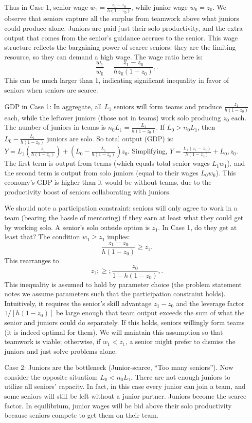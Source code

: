 \documentclass[12pt]{article}
\begin{document}
Thus in Case 1, {senior wage}
\(w_1 = \frac{z_1 - z_0}{h(1-z_0)}\), while {junior wage}
\(w_0 = z_0\). We observe that seniors capture all the {surplus}
from teamwork above what juniors could produce alone. Juniors are paid
just their solo productivity, and the extra output that comes from the
senior's guidance accrues to the senior. This wage structure reflects
the {bargaining power of scarce seniors}: they are the limiting
resource, so they can demand a high wage. The {wage ratio} here
is: 
\begin{equation}
\frac{w_1}{w_0}  =  \frac{z_1 - z_0}{hz_0(1-z_0)},.
\tag{5}
\end{equation}
This can be much larger than 1, indicating significant
inequality in favor of seniors when seniors are scarce.

{GDP in Case 1:} In aggregate, all \(L_1\) seniors will form
teams and produce \(\frac{z_1}{h(1-z_0)}\) each, while the leftover
juniors (those not in teams) work solo producing \(z_0\) each. The
number of juniors in teams is \(n_0 L_1 = \frac{L_1}{h(1-z_0)}\). If
\(L_0 > n_0 L_1\), then \(L_0 - \frac{L_1}{h(1-z_0)}\) juniors are
solo. So total output (GDP) is:
\(Y = L_1 \left(\frac{z_1}{h(1-z_0)}\right) + \left(L_0 - \frac{L_1}{h(1-z_0)}\right) z_0.\)
Simplifying, $ Y = \frac{L_1(z_1 - z_0)}{h(1-z_0)} +
L_0,z_0.$ The first term is output from teams (which equals total
senior wages \(L_1 w_1\)), and the second term is output from solo
juniors (equal to their wages \(L_0 w_0\)). This economy's GDP is
higher than it would be without teams, due to the productivity boost
of seniors collaborating with juniors.

We should note a {participation constraint}: seniors will only
agree to work in a team (bearing the hassle of mentoring) if they earn
at least what they could get by working solo. A senior's solo outside
option is \(z_1\). In Case 1, do they get at least that? The condition
\(w_1 \ge z_1\) implies: 
$$
\frac{z_1 - z_0}{h(1-z_0)} \ge z_1.
$$
This rearranges to 
\begin{equation}
z_1 ;\ge; \frac{z_0}{1 - h(1-z_0)},.
\tag{PC}
\end{equation}
This inequality is assumed to hold by parameter choice (the
problem statement notes we assume parameters such that the
participation constraint holds). Intuitively, it requires the senior's
skill advantage \(z_1 - z_0\) and the leverage factor \(1/[h(1-z_0)]\)
be large enough that team output exceeds the sum of what the senior
and juniors could do separately. If this holds, seniors willingly form
teams (it is indeed optimal for them). We will maintain this
assumption so that teamwork is viable; otherwise, if \(w_1 < z_1\), a
senior might prefer to dismiss the juniors and just solve problems
alone.
\item
{Case 2: Juniors are the bottleneck (Junior-scarce, ``Too many
seniors'').} Now consider the opposite situation: \(L_0 < n_0 L_1\).
There are not enough juniors to utilize all seniors' capacity. In
fact, in this case every junior can join a team, and some seniors will
still be left without a junior partner. Juniors become the scarce
factor. In equilibrium, junior wages will be bid {above} their
solo productivity because seniors compete to get them on their team.
\end{document}
